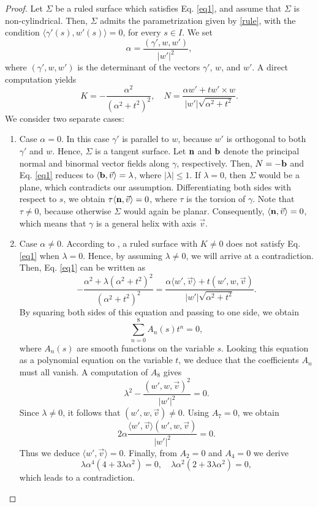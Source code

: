 \documentclass[12pt]{amsart}
\theoremstyle{definition}
\begin{document}
\begin{proof}
Let $\Sigma$ be a ruled surface which satisfies Eq. \eqref{eq1}, and assume that $\Sigma$ is non-cylindrical.  Then, $\Sigma$ admits the parametrization given by \eqref{rule}, with the condition $\langle \gamma'(s),w'(s)\rangle=0$, for every $s\in I$. We set
$$
\alpha=\frac{(\gamma',w,w')}{|w'|^2},
$$
where $(\gamma',w,w')$ is the determinant of the vectors $\gamma'$, $w$, and $w'$. A direct computation yields
$$
K=-\frac{\alpha^2}{(\alpha^2+t^2)^2}, \quad N=\frac{\alpha w'+tw'\times w}{|w'|\sqrt{\alpha^2+t^2}}.
$$
We consider two separate cases:
\begin{enumerate}
\item  Case $\alpha=0$. In this case $\gamma'$ is parallel to $w$, because $w'$ is orthogonal to both $\gamma'$ and $w$. Hence, $\Sigma$ is a tangent surface. Let ${\bf n}$ and ${\bf b}$ denote the principal normal and binormal vector fields along $\gamma$, respectively. Then, $N=-{\bf b}$ and Eq. \eqref{eq1} reduces to $\langle {\bf b} , \vec{v} \rangle =\lambda$, where $|\lambda| \leq 1$. If $\lambda=0$, then $\Sigma$ would be a plane, which contradicts our assumption. Differentiating both sides with respect to $s$, we obtain $\tau\langle {\bf n} , \vec{v} \rangle =0$, where $\tau$ is the torsion of $\gamma$. Note that $\tau \neq 0$, because otherwise $\Sigma$ would again be planar. Consequently, $\langle {\bf n} , \vec{v} \rangle =0$, which means that $\gamma$ is a general helix with axis $\vec{v}$. 

\item  Case $\alpha\neq 0$. According to \cite[Theorem 6]{al}, a ruled surface with $K\neq 0$ does not satisfy Eq. \eqref{eq1} when $\lambda = 0$. Hence, by assuming $\lambda \neq 0$, we will arrive at a contradiction. Then, Eq.   \eqref{eq1} can be written as
$$
-\frac{\alpha^2+\lambda(\alpha^2+t^2)^2}{(\alpha^2+t^2)^2}=\frac{\alpha \langle w', \vec{v} \rangle+t (w',w,\vec{v})}{|w'|\sqrt{\alpha^2+t^2}}.
$$
By squaring both sides of this equation and passing to one side,  we obtain 
$$
\sum_{n=0}^8A_n(s)t^n=0,
$$
where $A_n(s)$ are smooth functions on the variable $s$. Looking this equation as a polynomial equation on the variable $t$, we deduce that the coefficients $A_n$ must all vanish. A computation of $A_8$ gives
$$
\lambda^2-\frac{(w',w,\vec{v})^2}{|w'|^2}=0.
$$
Since $\lambda \neq 0$, it follows that $(w',w,\vec{v})\neq 0$. Using $A_7=0$, we obtain
$$
2\alpha\frac{\langle w', \vec{v} \rangle (w',w,\vec{v})}{|w'|^2}=0.
$$
Thus we deduce $\langle w', \vec{v} \rangle=0$. Finally, from $A_2=0$ and $A_4=0$ we derive
$$
\lambda\alpha^4(4+3\lambda\alpha^2)=0, \quad \lambda\alpha^2(2+3\lambda \alpha^2)=0,
$$
which leads to a contradiction.
\end{enumerate}
\end{proof}
\end{document}
